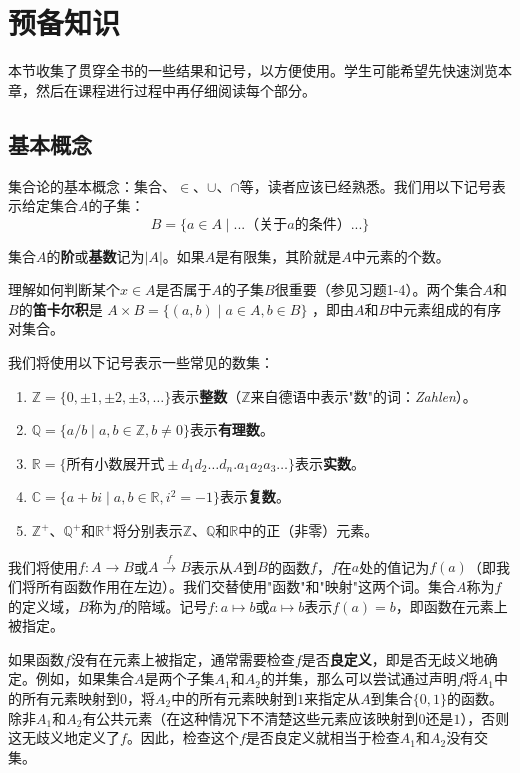 \setcounter{chapter}{-1}


\chapter{预备知识}

本节收集了贯穿全书的一些结果和记号，以方便使用。学生可能希望先快速浏览本章，然后在课程进行过程中再仔细阅读每个部分。

\section{基本概念}


集合论的基本概念：集合、$\in$、$\cup$、$\cap$等，读者应该已经熟悉。我们用以下记号表示给定集合$A$的子集：
\[ B = \{ a \in A \mid \text{...（关于$a$的条件）...} \} \]

集合$A$的\textbf{阶}或\textbf{基数}记为$|A|$。如果$A$是有限集，其阶就是$A$中元素的个数。

理解如何判断某个$x \in A$是否属于$A$的子集$B$很重要（参见习题1-4）。两个集合$A$和$B$的\textbf{笛卡尔积}是
$ A \times B = \{ (a, b) \mid a \in A, b \in B \} $
，即由$A$和$B$中元素组成的有序对集合。

我们将使用以下记号表示一些常见的数集：
\begin{enumerate}[label=(\arabic*)] 
\item $\mathbb{Z} = \{0, \pm 1, \pm 2, \pm 3, \ldots\}$表示\textbf{整数}（$\mathbb{Z}$来自德语中表示"数"的词：\textit{Zahlen}）。
\item $\mathbb{Q} = \{ a/b \mid a, b \in \mathbb{Z}, b \neq 0 \}$表示\textbf{有理数}。
\item $\mathbb{R} = \{ \text{所有小数展开式} \pm d_1d_2\ldots d_n.a_1a_2a_3\ldots \}$表示\textbf{实数}。
\item $\mathbb{C} = \{ a + bi \mid a, b \in \mathbb{R}, i^2 = -1 \}$表示\textbf{复数}。
\item $\mathbb{Z}^+$、$\mathbb{Q}^+$和$\mathbb{R}^+$将分别表示$\mathbb{Z}$、$\mathbb{Q}$和$\mathbb{R}$中的正（非零）元素。
\end{enumerate}

我们将使用$f: A \to B$或$A \xrightarrow{f} B$表示从$A$到$B$的函数$f$，$f$在$a$处的值记为$f(a)$（即我们将所有函数作用在左边）。我们交替使用"函数"和"映射"这两个词。集合$A$称为$f$的定义域，$B$称为$f$的陪域。记号$f: a \mapsto b$或$a \mapsto b$表示$f(a) = b$，即函数在元素上被指定。

如果函数$f$没有在元素上被指定，通常需要检查$f$是否\textbf{良定义}，即是否无歧义地确定。例如，如果集合$A$是两个子集$A_1$和$A_2$的并集，那么可以尝试通过声明$f$将$A_1$中的所有元素映射到$0$，将$A_2$中的所有元素映射到$1$来指定从$A$到集合$\{0, 1\}$的函数。除非$A_1$和$A_2$有公共元素（在这种情况下不清楚这些元素应该映射到$0$还是$1$），否则这无歧义地定义了$f$。因此，检查这个$f$是否良定义就相当于检查$A_1$和$A_2$没有交集。

